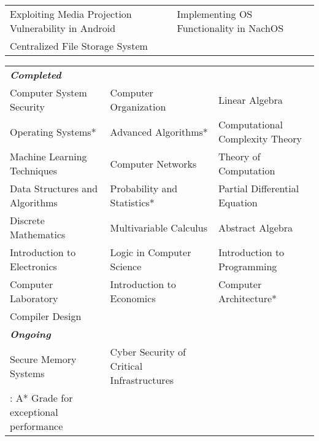 \documentclass[12pt, a4paper]{awesome-cv}
\begin{document}
\vspace{-0.3cm}
{\fontsize{12pt}{1em}\bodyfontlight\upshape\color{text}
\begin{tabular}{l l}
    Exploiting Media Projection Vulnerability in Android & Implementing OS Functionality in NachOS\\
    Centralized File Storage System\\ 
 
 \end{tabular}
 }
\vspace{-0.3cm}
{\fontsize{11pt}{1em}\bodyfontlight\upshape\color{text}
\begin{tabular}{l l l}
\textbf{\textit{Completed}}\\
 Computer System Security & Computer Organization & Linear Algebra\\ 
 Operating Systems* & Advanced Algorithms* & Computational Complexity Theory\\
 Machine Learning Techniques & Computer Networks & Theory of Computation\\
 Data Structures and Algorithms & Probability and Statistics* & Partial Differential Equation\\
 Discrete Mathematics  & Multivariable Calculus & Abstract Algebra\\
 Introduction to Electronics & Logic in Computer Science & Introduction to Programming \\
 Computer Laboratory & Introduction to Economics & Computer Architecture*\\
 Compiler Design\\
 
\textbf{\textit{Ongoing}}\\
 Secure Memory Systems & Cyber Security of Critical Infrastructures\\

 {\footnotesize  * : A* Grade for exceptional performance}\\
 \end{tabular}
 }
\vspace{-0.3cm}
\end{document}
